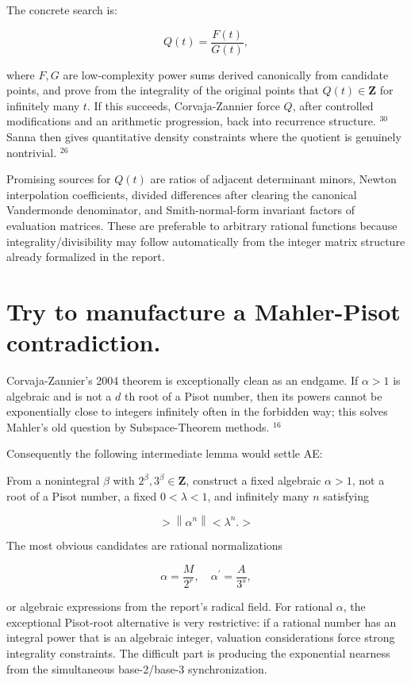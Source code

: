 \documentclass[10pt]{article}
\begin{document}
The concrete search is:

$$
Q(t)=\frac{F(t)}{G(t)},
$$

where $F, G$ are low-complexity power sums derived canonically from candidate points, and prove from the integrality of the original points that $Q(t) \in \mathbf{Z}$ for infinitely many $t$. If this succeeds, Corvaja-Zannier force $Q$, after controlled modifications and an arithmetic progression, back into recurrence structure. ${ }^{30}$ Sanna then gives quantitative density constraints where the quotient is genuinely nontrivial. ${ }^{26}$

Promising sources for $Q(t)$ are ratios of adjacent determinant minors, Newton interpolation coefficients, divided differences after clearing the canonical Vandermonde denominator, and Smith-normal-form invariant factors of evaluation matrices. These are preferable to arbitrary rational functions because integrality/divisibility may follow automatically from the integer matrix structure already formalized in the report.

\section*{Try to manufacture a Mahler-Pisot contradiction.}
Corvaja-Zannier's 2004 theorem is exceptionally clean as an endgame. If $\alpha>1$ is algebraic and is not a $d$ th root of a Pisot number, then its powers cannot be exponentially close to integers infinitely often in the forbidden way; this solves Mahler's old question by Subspace-Theorem methods. ${ }^{16}$

Consequently the following intermediate lemma would settle AE:

From a nonintegral $\beta$ with $2^{\beta}, 3^{\beta} \in \mathbf{Z}$, construct a fixed algebraic $\alpha>1$, not a root of a Pisot number, a fixed $0<\lambda<1$, and infinitely many $n$ satisfying

$$
>\left\|\alpha^{n}\right\|<\lambda^{n} .>
$$

The most obvious candidates are rational normalizations

$$
\alpha=\frac{M}{2^{r}}, \quad \alpha^{\prime}=\frac{A}{3^{s}},
$$

or algebraic expressions from the report's radical field. For rational $\alpha$, the exceptional Pisot-root alternative is very restrictive: if a rational number has an integral power that is an algebraic integer, valuation considerations force strong integrality constraints. The difficult part is producing the exponential nearness from the simultaneous base-2/base-3 synchronization.
\end{document}
